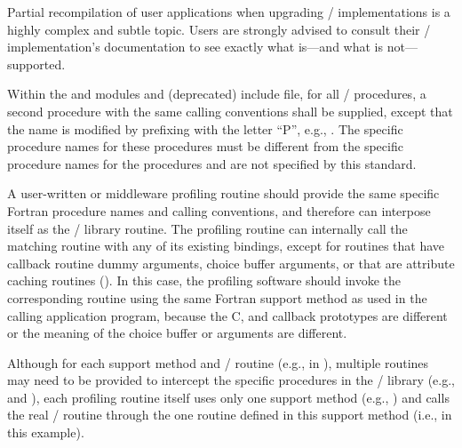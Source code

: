 \begin{users}
Partial recompilation of user applications when upgrading \MPI/ implementations
is a highly complex and subtle topic.
Users are strongly advised to consult their \MPI/ implementation's documentation
to see exactly what is---and what is not---supported.
\end{users}

Within the  and  modules and (deprecated)  include file,
for all \MPI/ procedures, a second
procedure with the same calling conventions shall be
supplied, except that the name is modified by prefixing with the
letter ``P'', e.g., .
The specific procedure names
for these  procedures must be different from the
specific procedure names for the  procedures
and are not specified by this standard.

A user-written or middleware profiling routine
should provide the same specific Fortran
procedure names and calling conventions, and therefore
can interpose itself as the \MPI/ library routine.
The profiling routine can internally call the matching 
routine with any of its existing bindings,
except for routines that have callback routine dummy arguments,
choice buffer arguments, or that are attribute caching routines
%
%
%
().
In this case, the profiling software
should
invoke the corresponding  routine using
the same Fortran
support method as used in the calling application program,
because the C,  and  callback
prototypes are different or the meaning of the choice buffer
or  arguments are different.

\begin{users}
Although for each support method and \MPI/ routine
(e.g.,  in ),
multiple routines may need to be provided to intercept the
specific procedures in the \MPI/ library
(e.g.,  and ),
each profiling routine itself uses only one support method
(e.g., )
and calls the real \MPI/ routine through the one
 routine defined in this support method
(i.e.,  in this example).
\end{users}

